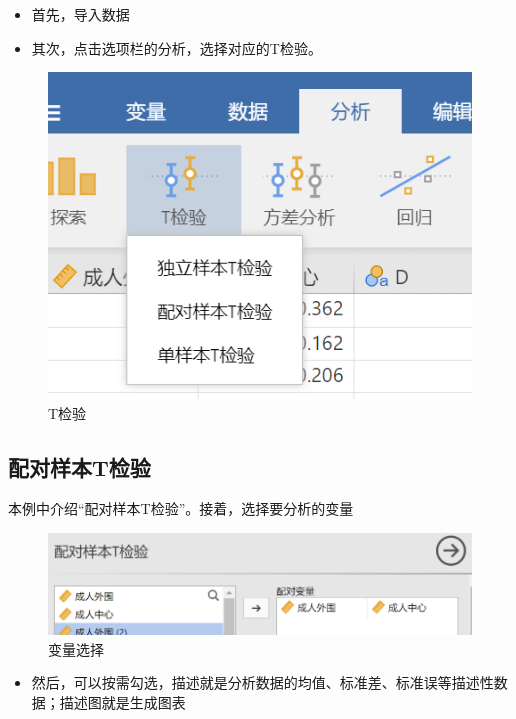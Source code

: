 \documentclass[]{ctexbook}
\providecommand{\tightlist}{%
  \setlength{\itemsep}{0pt}\setlength{\parskip}{0pt}}
\theoremstyle{definition}
\theoremstyle{definition}
\theoremstyle{definition}
\theoremstyle{definition}
\theoremstyle{remark}
\begin{document}
\begin{itemize}
\tightlist
\item
  首先，导入数据
\item
  其次，点击选项栏的分析，选择对应的T检验。
\end{itemize}

\begin{figure}

{\centering \includegraphics[width=0.5\linewidth]{img/jamovi/ttest} 

}

\caption{T检验}\label{fig:jamovi-ttest}
\end{figure}

\subsection{配对样本T检验}\label{ux914dux5bf9ux6837ux672ctux68c0ux9a8c}

本例中介绍``配对样本T检验''。接着，选择要分析的变量

\begin{figure}

{\centering \includegraphics[width=0.6\linewidth]{img/jamovi/ttest-compare} 

}

\caption{变量选择}\label{fig:jamovi-ttest-compare}
\end{figure}

\begin{itemize}
\tightlist
\item
  然后，可以按需勾选，描述就是分析数据的均值、标准差、标准误等描述性数据；描述图就是生成图表
\end{itemize}
\end{document}

